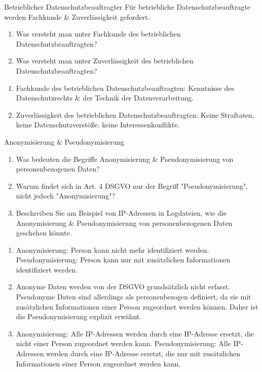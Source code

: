 \documentclass{article}
\begin{document}
\begin{exercise}{Betrieblicher Datenschutzbeauftragter}
  Für betriebliche Datenschutzbeauftragte werden Fachkunde \& Zuverlässigkeit gefordert.
  \begin{enumerate}
    \item Was versteht man unter Fachkunde des betrieblichen Datenschutzbeauftragten?
    \item Was versteht man unter Zuverlässigkeit des betrieblichen Datenschutzbeauftragten?
  \end{enumerate}

  \begin{solution}
    \begin{enumerate}
      \item Fachkunde des betrieblichen Datenschutzbeauftragten: Kenntnisse des Datenschutzrechts \& der Technik der Datenverarbeitung.
      \item Zuverlässigkeit des betrieblichen Datenschutzbeauftragten: Keine Straftaten, keine Datenschutzverstöße, keine Interessenkonflikte.
    \end{enumerate}
  \end{solution}
\end{exercise}

\begin{exercise}{Anonymisierung \& Pseudonymisierung}
  \begin{enumerate}
    \item Was bedeuten die Begriffe Anonymisierung \& Pseudonymisierung von personenbezogenen Daten?
    \item Warum findet sich in Art. 4 DSGVO nur der Begriff "Pseudonymisierung", nicht jedoch "Anonymisierung"?
    \item Beschreiben Sie am Beispiel von IP-Adressen in Logdateien, wie die Anonymisierung \& Pseudonymisierung von personenbezogenen Daten geschehen könnte.
  \end{enumerate}

  \begin{solution}
    \begin{enumerate}
      \item Anonymisierung: Person kann nicht mehr identifiziert werden. Pseudonymisierung: Person kann nur mit zusätzlichen Informationen identifiziert werden.
      \item Anonyme Daten werden von der DSGVO grundsätzlich nicht erfasst. Pseudonyme Daten sind allerdings als personenbezogen definiert, da sie mit zusätzlichen Informationen einer Person zugeordnet werden können. Daher ist die Pseudonymisierung explizit erwähnt.
      \item Anonymisierung: Alle IP-Adressen werden durch eine IP-Adresse ersetzt, die nicht einer Person zugeordnet werden kann. Pseudonymisierung: Alle IP-Adressen werden durch eine IP-Adresse ersetzt, die nur mit zusätzlichen Informationen einer Person zugeordnet werden kann.
    \end{enumerate}
  \end{solution}
\end{exercise}
\end{document}

